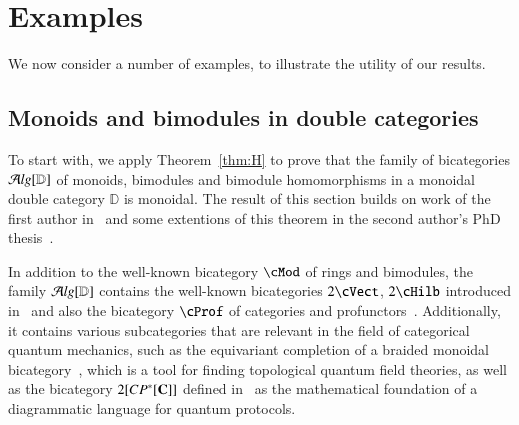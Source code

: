 \section{Examples}\label{sec:Alg} 

We now consider a number of examples, to illustrate the utility of our results.

\subsection{Monoids and bimodules in double categories}
\label{sec:mod}

To start with, we apply Theorem~\ref{thm:H} to prove that the family of bicategories $\mathcal{A}\mathit{lg}[{\mathbb{D}}]$ of monoids, bimodules and bimodule homomorphisms in a monoidal double category $\mathbb{D}$ is monoidal. The result of this section builds on work of the first author in~\cite[Theorem 11.5]{shulman:frbi} and some extentions of this theorem in the second author's PhD thesis~\cite[Chapter 5]{westerPhDthesis}.

In addition to the well-known bicategory $\cMod$ of rings and bimodules,
the family $\mathcal{A}\mathit{lg}[{\mathbb{D}}]$ contains the well-known bicategories $2\cVect$, $2\cHilb$ introduced in~\cite{kapranov562,baez2004higher} and also the bicategory $\cProf$ of categories and profunctors~\cite{benabou}. Additionally, it contains various subcategories that are relevant in the field of categorical quantum mechanics, such as the equivariant completion of a braided monoidal bicategory~\cite{carquevillerunkel}, which is a tool for finding topological quantum field theories, as well as the bicategory $2[CP^*[{\bf C}]]$ defined in~\cite{heunenvicarywester} as the mathematical foundation of a diagrammatic language for quantum protocols. %

